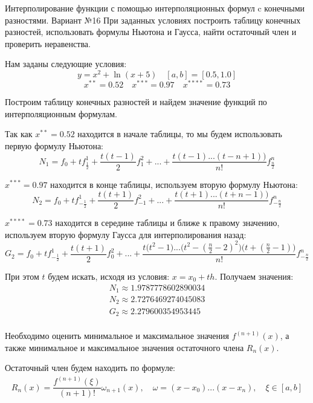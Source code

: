 \documentclass[14pt, a4paper, fleqn]{extarticle}
\begin{document}
	\tableofcontents
	\pagebreak
	Интерполирование функции с помощью интерполяционных формул c конечными
	разностями. Вариант №16
	При заданных условиях построить таблицу конечных разностей, использовать формулы Ньютона и Гаусса, найти остаточный член и проверить неравенства.
	
	Нам заданы следующие условия:
	\[
	y = x^2 + \ln(x + 5) \quad [a, b] = [0.5, 1.0]
	\]
	\[
	x^{**} = 0.52 \quad x^{***} = 0.97 \quad x^{****} = 0.73
	\]
	
	Построим таблицу конечных разностей и найдем значение функций по интерполяционным формулам.
	
	Так как $x^{**} = 0.52$ находится в начале таблицы, то мы будем использовать первую формулу Ньютона:
	\[
	N_1 = f_0 + tf^1_{\frac{1}{2}} + \dfrac{t(t-1)}{2}f^2_1 + ... + \dfrac{t(t-1)...(t-n+1))}{n!}f^n_{\frac{n}{2}}
	\]
	
	$x^{***} = 0.97$ находится в конце таблицы, используем вторую формулу Ньютона:
	\[
	N_2 = f_0 + tf^1_{-\frac{1}{2}} + \dfrac{t(t+1)}{2}f^2_{-1} + ... + \dfrac{t(t+1)...(t+n-1))}{n!}f^n_{-\frac{n}{2}}
	\]
	
	$x^{****} = 0.73$ находится в середине таблицы и ближе к правому значению, используем вторую формулу Гаусса для интерполирования назад:
	\[
	G_2 = f_0 + tf^1_{-\frac{1}{2}} + \dfrac{t(t+1)}{2}f^2_{0} + ... + \dfrac{t\big(t^2-1\big)...\big(t^2-(\frac{n}{2}-2)^2\big)\big(t + (\frac{n}{2}-1)\big)}{n!}f^n_{-\frac{n}{2}}
	\]
	
	При этом $t$ будем искать, исходя из условия: $x = x_0 + th$. Получаем значения:
	\begin{multline*}
	N_1 \approx 1.9787778602890034 \\
	N_2 \approx 2.7276469274045083 \\
	G_2 \approx 2.279600354953445 \\ 
	\end{multline*}
	
	Необходимо оценить минимальное и максимальное значения $f^{(n+1)}(x)$, а также минимальное и максимальное значения остаточного члена $R_n(x)$.
	
	Остаточный член будем находить по формуле:
	\begin{multline*}
	R_n(x) = \dfrac{f^{(n+1)}(\xi)}{(n+1)!}\omega_{n+1}(x), \quad \omega = (x - x_0)...(x-x_n), \quad \xi \in [a, b] \\
	\end{multline*}
	
\end{document}
